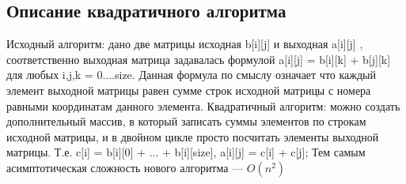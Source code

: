 \documentclass[a4peper, 12pt, titlepage, finall]{extreport}
\begin{document}
        \subsection{Описание квадратичного алгоритма}
            Исходный алгоритм: дано две матрицы исходная {\ttfamily b[i][j]} и выходная {\ttfamily a[i][j]} , соответственно
            выходная матрица задавалась формулой {\ttfamily a[i][j] = b[i][k] + b[j][k]} для любых {\ttfamily i,j,k = 0....size.}
            Данная формула по смыслу означает что каждый элемент выходной матрицы равен сумме
            строк исходной матрицы с номера равными координатам данного элемента.
            Квадратичный алгоритм: можно создать дополнительный массив, в который записать суммы
            элементов по строкам исходной матрицы, и в двойном цикле просто посчитать элементы
            выходной матрицы. Т.е. {\ttfamily c[i] = b[i][0] + ... + b[i][size], a[i][j] = c[i] + c[j];} Тем самым
            асимптотическая сложность нового алгоритма — {\ttfamily $O(n^{2})$ }
\end{document}
